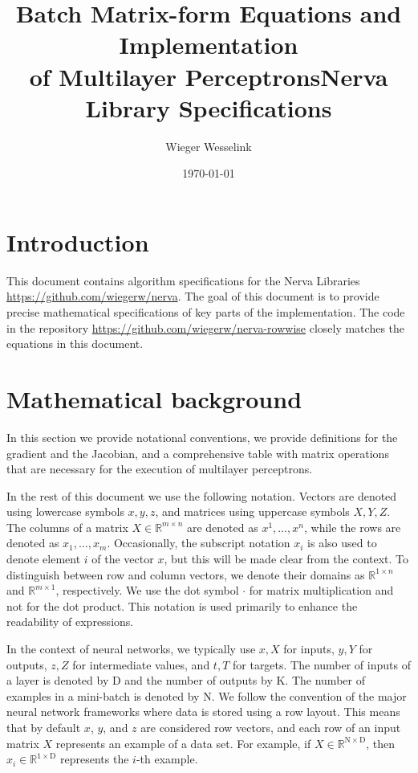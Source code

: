 \documentclass{article}
\newcommand{\const}[1]{\ensuremath{\mathrm{#1}}} %
\newcommand{\Reals}{\mathbb{R}}
\begin{document}
\title{\centering Batch Matrix-form Equations and Implementation \\ of Multilayer Perceptrons}

\title{Nerva Library Specifications}
\author{Wieger Wesselink}
\date{\today}

\maketitle

\tableofcontents

\section{Introduction}
This document contains algorithm specifications for the Nerva Libraries \url{https://github.com/wiegerw/nerva}. The goal of this document is to provide precise mathematical specifications of key parts of the implementation. The code in the repository \url{https://github.com/wiegerw/nerva-rowwise} closely matches the equations in this document.

\section{Mathematical background} \label{section:mathematical-background}
In this section we provide notational conventions, we provide definitions for the gradient and the Jacobian, and a comprehensive table with matrix operations that are necessary for the execution of multilayer perceptrons.

In the rest of this document we use the following notation. Vectors are denoted using lowercase symbols $x, y, z$, and matrices using uppercase symbols $X, Y, Z$. The columns of a matrix $X \in \Reals^{m \times n}$ are denoted as $x^1, \ldots, x^n$, while the rows are denoted as $x_1, \ldots, x_m$. Occasionally, the subscript notation $x_i$ is also used to denote element $i$ of the vector $x$, but this will be made clear from the context.
To distinguish between row and column vectors, we denote their domains as $\Reals^{1 \times n}$ and $\Reals^{m \times 1}$, respectively. We use the dot symbol $\cdot$ for matrix multiplication and not for the dot product. This notation is used primarily to enhance the readability of expressions.

In the context of neural networks, we typically use $x, X$ for inputs, $y, Y$ for outputs, $z, Z$ for intermediate values, and $t, T$ for targets. The number of inputs of a layer is denoted by $\const{D}$ and the number of outputs by $\const{K}$. The number of examples in a mini-batch is denoted by $\const{N}$.
We follow the convention of the major neural network frameworks where data is stored using a row layout. This means that by default $x$, $y$, and $z$ are considered row vectors, and each row of an input matrix $X$ represents an example of a data set. For example, if $X \in \Reals^{\const{N} \times \const{D}}$, then $x_i \in \Reals^{1 \times \const{D}}$ represents the $i$-th example.
\end{document}
